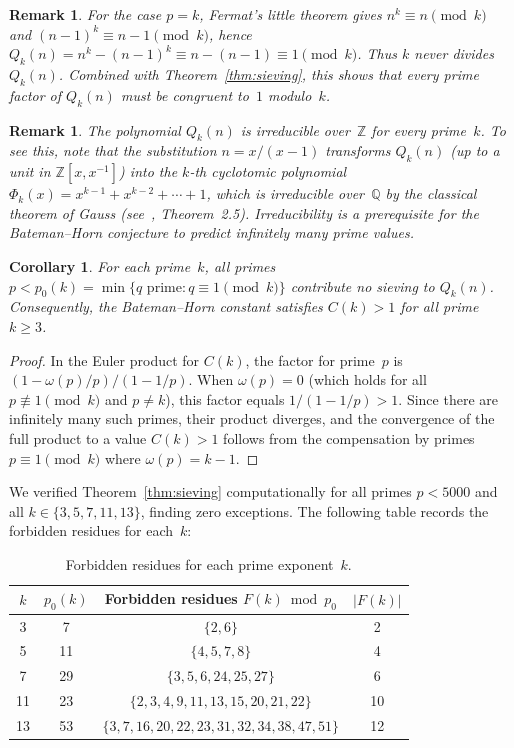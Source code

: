 \documentclass[11pt,a4paper]{article}
\newtheorem{corollary}[theorem]{Corollary}
\newtheorem{remark}[theorem]{Remark}
\newcommand{\Qk}{Q_k}
\newcommand{\ZZ}{\mathbb{Z}}
\newcommand{\QQ}{\mathbb{Q}}
\begin{document}
\begin{remark}\label{rem:pk}
For the case $p = k$, Fermat's little theorem gives $n^k \equiv n \pmod{k}$ and $(n-1)^k \equiv n-1 \pmod{k}$, hence $\Qk(n) = n^k - (n-1)^k \equiv n - (n-1) \equiv 1 \pmod{k}$. Thus $k$ never divides $\Qk(n)$. Combined with Theorem~\ref{thm:sieving}, this shows that \emph{every} prime factor of $\Qk(n)$ must be congruent to~$1$ modulo~$k$.
\end{remark}

\begin{remark}\label{rem:irred}
The polynomial $\Qk(n)$ is irreducible over~$\ZZ$ for every prime~$k$. To see this, note that the substitution $n = x/(x-1)$ transforms $\Qk(n)$ (up to a unit in $\ZZ[x,x^{-1}]$) into the $k$-th cyclotomic polynomial $\Phi_k(x) = x^{k-1} + x^{k-2} + \cdots + 1$, which is irreducible over~$\QQ$ by the classical theorem of Gauss (see~\cite{washington}, Theorem~2.5). Irreducibility is a prerequisite for the Bateman--Horn conjecture to predict infinitely many prime values.
\end{remark}

\begin{corollary}\label{cor:Cbig}
For each prime~$k$, all primes $p < p_0(k) = \min\{q \text{ prime} : q \equiv 1 \pmod{k}\}$ contribute no sieving to $\Qk(n)$. Consequently, the Bateman--Horn constant satisfies $C(k) > 1$ for all prime $k \ge 3$.
\end{corollary}

\begin{proof}
In the Euler product for $C(k)$, the factor for prime~$p$ is $(1 - \omega(p)/p)/(1 - 1/p)$. When $\omega(p) = 0$ (which holds for all $p \not\equiv 1 \pmod{k}$ and $p \ne k$), this factor equals $1/(1 - 1/p) > 1$. Since there are infinitely many such primes, their product diverges, and the convergence of the full product to a value $C(k) > 1$ follows from the compensation by primes $p \equiv 1 \pmod{k}$ where $\omega(p) = k - 1$.
\end{proof}

We verified Theorem~\ref{thm:sieving} computationally for all primes $p < 5000$ and all $k \in \{3, 5, 7, 11, 13\}$, finding zero exceptions. The following table records the forbidden residues for each~$k$:

\begin{table}[ht]
\centering
\caption{Forbidden residues for each prime exponent~$k$.}\label{tab:forbidden}
\smallskip
\begin{tabular}{cccc}
\toprule
$k$ & $p_0(k)$ & Forbidden residues $F(k) \bmod p_0$ & $|F(k)|$ \\
\midrule
3  & 7  & $\{2, 6\}$ & 2 \\
5  & 11 & $\{4, 5, 7, 8\}$ & 4 \\
7  & 29 & $\{3, 5, 6, 24, 25, 27\}$ & 6 \\
11 & 23 & $\{2, 3, 4, 9, 11, 13, 15, 20, 21, 22\}$ & 10 \\
13 & 53 & $\{3, 7, 16, 20, 22, 23, 31, 32, 34, 38, 47, 51\}$ & 12 \\
\bottomrule
\end{tabular}
\end{table}
\end{document}

